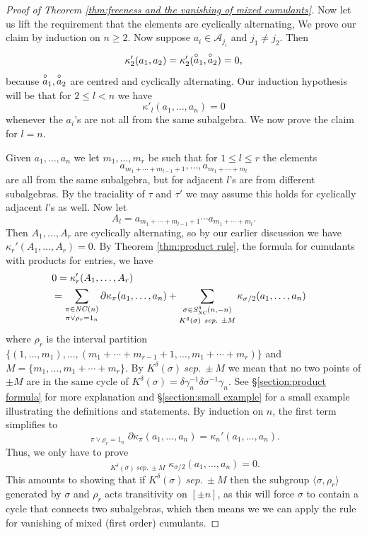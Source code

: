 \documentclass[11pt]{amsart}
\theoremstyle{definition}
\numberwithin{theorem}{section}
\newcommand{\cA}{\mathcal{A}}
\newcommand{\centre}[1]{\hbox{$\mathop{#1}\limits^\circ$}}
\newcommand{\NC}{\mathit{NC}}
\newcommand{\sep}{\mathit{\ sep.\ }}
\newcommand{\ab}{\allowbreak}
\begin{document}
\begin{proof}[Proof of Theorem \ref{thm:freeness and the vanishing of mixed cumulants}]
Now let us lift the requirement that the elements are
cyclically alternating, We prove our claim by induction on
$n \geq 2$. Now suppose $a_i \in \cA_{j_i}$ and $j_1 \not =
j_2$. Then
\[
\kappa'_2(a_1, a_2)
= \kappa'_2(\centre{a}_1, \centre{a}_2) = 0,
\]
because $\centre{a}_1, \centre{a}_2$ are centred and
cyclically alternating. Our induction hypothesis will be
that for $2 \leq l < n$ we have
\[
\kappa'_l(a_1, \dots, a_n) = 0
\]
whenever the $a_i$'s are not all from the same
subalgebra. We now prove the claim for $l = n$.


Given $a_1, \dots, a_n$ we let $m_1, \dots, m_r$ be such
that for $1 \leq l \leq r$ the elements
\[
a_{m_1 + \cdots + m_{l-1}+1}, \dots, a_{m_1 + \cdots + m_l}
\] 
are all from the same subalgebra, but for adjacent $l$'s are
from different subalgebras. By the traciality of $\tau$ and
$\tau'$ we may assume this holds for cyclically adjacent
$l$'s as well. Now let
\[
A_l = a_{m_1 + \cdots + m_{l-1}+1} \cdots a_{m_1 + \cdots + m_l}.
\]
Then $A_1, \dots, A_r$ are cyclically alternating, so by our
earlier discussion we have $\kappa_r'(A_1, \dots,\ab A_r) =
0$. By Theorem \ref{thm:product rule}, the formula for
cumulants with products for entries, we have
\begin{align*}\lefteqn{
0 =  \kappa'_r(A_1, \dots, A_r)} \\
&  = 
\mathop{\sum_{\pi \in \NC(n)}}_
{\pi \vee \rho_r = 1_n}
 \partial\kappa_\pi(a_1, \dots, a_n)
+
\mathop{\sum_{\sigma \in S_\NC^\delta(n, -n)}}_
{K^\delta(\sigma) \sep \pm M}
\kappa_{\sigma/2}(a_1, \dots, a_n)
\end{align*}
where $\rho_r$ is the interval partition $\{ (1, \dots,
m_1), \dots, (m_1 + \cdots + m_{r-1} + 1, \dots,\ab m_1 +
\cdots + m_r)\}$ and $M = \{m_1, \dots, m_1 + \cdots +
m_r\}$.  By $K^\delta(\sigma) \sep \pm M$ we mean that no
two points of $\pm M$ are in the same cycle of
$K^\delta(\sigma) = \delta \gamma_n^{-1} \delta \sigma^{-1}
\gamma_n$. See \S \ref{section:product formula} for more
explanation and \S \ref{section:small example} for a small
example illustrating the definitions and statements. By
induction on $n$, the first term simplifies to
\[
\mathop{\sum_{\pi \in \NC(n)}}_
{\pi \vee \rho_r = 1_n}
 \partial\kappa_\pi(a_1, \dots, a_n) = \kappa_n'(a_1, \dots, a_n).
\]
Thus, we only have to prove
\[
\mathop{\sum_{\sigma \in S_\NC^\delta(n, -n)}}_
{K^\delta(\sigma) \sep \pm M}
\kappa_{\sigma/2}(a_1, \dots, a_n) = 0.
\]
This amounts to showing that if $K^\delta(\sigma) \sep \pm
M$ then the subgroup $\langle \sigma , \rho_r\rangle$
generated by $\sigma$ and $\rho_r$ acts transitivity on
$[\pm n]$, as this will force $\sigma$ to contain a cycle
that connects two subalgebras, which then means we we can
apply the rule for vanishing of mixed (first order)
cumulants.


\end{proof}
\end{document}

